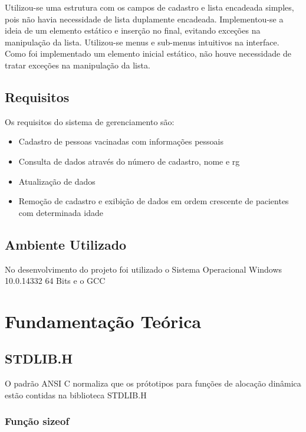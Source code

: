 \documentclass[12pt]{article}
\begin{document}
Utilizou-se uma estrutura com os campos de cadastro e lista encadeada simples, pois não havia necessidade de lista duplamente
encadeada. Implementou-se a ideia de um elemento estático e inserção no final, evitando exceções na manipulação da lista.
Utilizou-se menus e sub-menus intuitivos na interface. Como foi implementado um elemento inicial estático, não houve necessidade
de tratar exceções na manipulação da lista.      

\subsection{Requisitos}

Os requisitos do sistema de gerenciamento são:\\

\begin{itemize}
\item Cadastro de pessoas vacinadas com informações pessoais
\item Consulta de dados através do número de cadastro, nome e rg
\item Atualização de dados
\item Remoção de cadastro e exibição de dados em ordem crescente de pacientes com determinada idade
\end{itemize}

\subsection{Ambiente Utilizado}

No desenvolvimento do projeto foi utilizado o Sistema Operacional Windows 10.0.14332 64 Bits e
o GCC 

\section{Fundamentação Teórica}

\subsection{STDLIB.H}

O padrão ANSI C normaliza que os prótotipos para funções de alocação dinâmica
estão contidas na biblioteca STDLIB.H

\subsubsection{Função sizeof}
 
\end{document}
